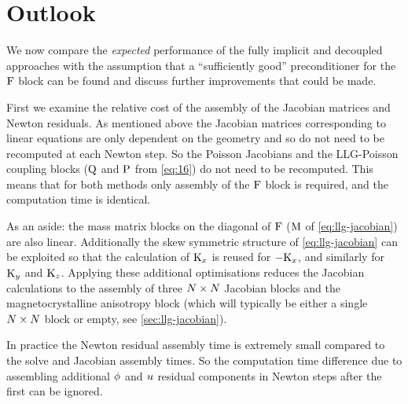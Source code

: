 


\section{Outlook}
\label{sec:furth-optim-opport}

We now compare the \emph{expected} performance of the fully implicit and decoupled approaches with the assumption that a ``sufficiently good'' preconditioner for the $\mathrm{F}$ block can be found and discuss further improvements that could be made.

First we examine the relative cost of the assembly of the Jacobian matrices and Newton residuals.
As mentioned above the Jacobian matrices corresponding to linear equations are only dependent  on the geometry and so do not need to be recomputed at each Newton step.
So the Poisson Jacobians and the LLG-Poisson coupling blocks ($\mathrm{Q}$ and $\mathrm{P}$ from \cref{eq:16}) do not need to be recomputed.
This means that for both methods only assembly of the $\mathrm{F}$ block is required, and the computation time is identical.

As an aside: the mass matrix blocks on the diagonal of $\mathrm{F}$ ($\mathrm{M}$ of \cref{eq:llg-jacobian}) are also linear.
Additionally the skew symmetric structure of \cref{eq:llg-jacobian} can be exploited so that the calculation of $\mathrm{K}_x$ is reused for $-\mathrm{K}_x$, and similarly for $\mathrm{K}_y$ and $\mathrm{K}_z$.
Applying these additional optimisations reduces the Jacobian calculations to the assembly of three $N \times N$ Jacobian blocks and the magnetocrystalline anisotropy block (which will typically be either a single $N \times N$ block or empty, see \cref{sec:llg-jacobian}).

In practice the Newton residual assembly time is extremely small compared to the solve and Jacobian assembly times.
So the computation time difference due to assembling additional $\phi$ and $u$ residual components in Newton steps after the first can be ignored.

